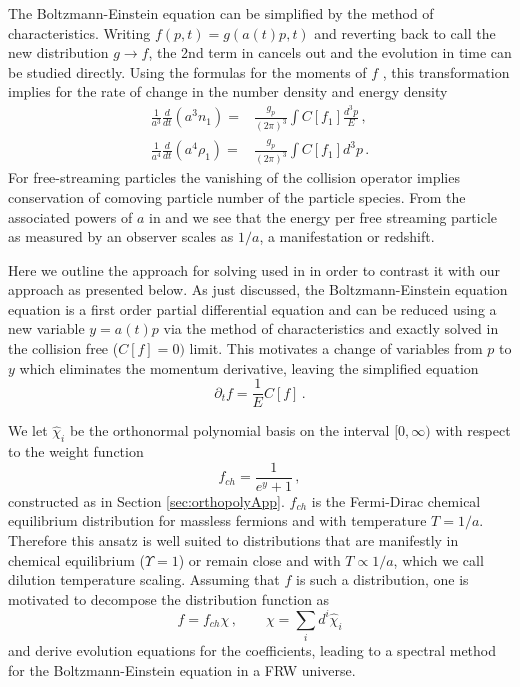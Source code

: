 The Boltzmann-Einstein equation  can be simplified by the method of characteristics. Writing $f(p, t)=g(a(t)p,t)$ and reverting back to call the new distribution $g\to f$, the 2nd term in  cancels out and the evolution in time can be studied directly.  Using the formulas for the moments of $f$ , this transformation implies for the rate of change in the   number density and energy density  
\begin{align}\label{n:div}
\frac{1}{a^3}\frac{d}{dt}(a^3n_1)=&\frac{g_p}{(2\pi)^3}\int C[f_1] \frac{d^3p}{E}\,,\\
\label{rho:div}
\frac{1}{a^4}\frac{d}{dt}(a^4\rho_1)=&\frac{g_p}{(2\pi)^3}\int C[f_1] d^3p \,.
\end{align} 
For free-streaming particles the vanishing of the collision operator implies conservation of comoving particle number of the particle species. From the associated powers of $a$ in  and  we see that the energy per free streaming particle as measured by an observer scales as $1/a$, a manifestation or redshift.


Here we outline the approach for solving  used in \cite{Esposito:2000hi,Mangano:2001iu} in order to contrast it with our approach as presented below.  As just discussed, the Boltzmann-Einstein equation equation  is a first order partial differential equation and can be reduced using a new variable $y=a(t)p$  via the method of characteristics and exactly solved in the collision free ($C[f]=0)$ limit.   This motivates a change of variables from $p$ to $y$ which eliminates the momentum derivative, leaving the simplified equation
\begin{equation}\label{aVars}
\partial_tf=\frac{1}{E} C[f]\,.
\end{equation}

We let $\hat\chi_i$ be the orthonormal polynomial basis on the interval $[0,\infty)$ with respect to the weight function
\begin{equation}\label{freeStreamWeight}
f_{ch}=\frac{1}{e^y+1}\,,
\end{equation}
constructed as in Section \ref{sec:orthopolyApp}. $f_{ch}$ is the Fermi-Dirac chemical equilibrium distribution for massless fermions and with temperature $T=1/a$.  Therefore this ansatz is well suited to distributions that are manifestly in chemical equilibrium ($\Upsilon=1$) or remain close and with $T\propto 1/a$, which we call dilution temperature scaling.  Assuming that $f$ is such a distribution, one is   motivated to decompose the distribution function as
\begin{equation}\label{freeStreamAnsatz}
f=f_{ch}\chi\,,\qquad \chi=\sum_i d^i\hat\chi_i
\end{equation}
and derive evolution equations for the coefficients, leading to a spectral method for the Boltzmann-Einstein equation in a FRW universe.

